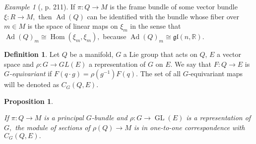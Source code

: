 \documentclass[12pt, letterpaper, reqno]{amsart}
\theoremstyle{definition}
\newtheorem{df}{Definition}
\theoremstyle{plain}
\newtheorem{prop}{Proposition}
\theoremstyle{remark}
\newtheorem{ex}{Example}
\begin{document}
\begin{ex}[\cite{montgomery2002tour}, p. 211]
	If $ \pi:Q \rightarrow M $ is the frame bundle of some vector bundle $ \xi: R \rightarrow M, $ then $ \operatorname{Ad}(Q) $ can be identified with the bundle whose fiber over $ m\in M $ is the space of linear maps on $ \xi_m $ in the sense that $ \operatorname{Ad} (Q)_m \cong \operatorname{Hom}(\xi_m,\xi_m),  $ because $ \operatorname{Ad}(Q)_m\cong \mathfrak{gl}(n, \mathbb{R}).  $ 
\end{ex}
\begin{df}\label{df:equivariant}
	Let $ Q $ be a manifold, $ G $ a Lie group that acts on $ Q $, $ E $ a vector space and $ \rho: G \rightarrow GL(E) $ a representation of $ G $ on $ E $. We say that $ F: Q \rightarrow E $ is \textit{$G$-equivariant} if $ F(q\cdot g) = \rho(g^{-1})F(q). $ The set of all $ G $-equivariant maps will be denoted as $ C_G(Q,E). $  
\end{df}
\begin{prop}\label{prop:equiv_section_equivariant}
	
If $ \pi: Q \rightarrow M $ is a principal $ G $-bundle and $ \rho: G \rightarrow \operatorname{GL} (E) $ is a representation  of $ G, $ the module of sections of $ \rho(Q) \rightarrow M $ is in one-to-one correspondence with $ C_G(Q,E). $
\end{prop}
\end{document}
